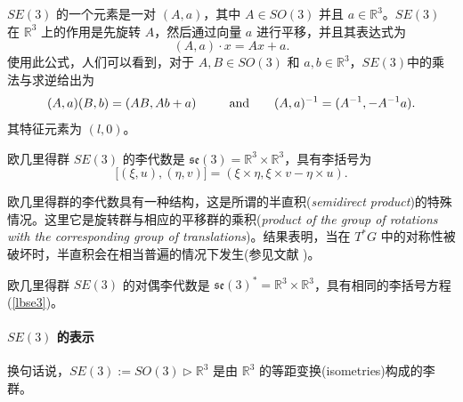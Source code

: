 \documentclass[11pt,fontset=founder]{ctexart}
\begin{document}
$SE(3)$ 的一个元素是一对 $(A,a)$，其中 $A\in SO(3)$ 并且 $a\in \mathbb{R}^{3}$。$SE(3)$ 在 $\mathbb{R}^{3}$ 上的作用是先旋转 $A$，然后通过向量 $a$ 进行平移，并且其表达式为
\begin{equation*}
(A,a)\cdot x=Ax+a.
\end{equation*}
使用此公式，人们可以看到，对于 $A,B\in SO(3)$ 和 $a,b\in \mathbb{R}^{3}$，$SE(3)$中的乘法与求逆给出为
\begin{equation*}
(A,a)(B,b)=(AB,Ab+a)\qquad \text{and\qquad }(A,a)^{-1}=(A^{-1},-A^{-1}a).
\end{equation*}
其特征元素为 $(l,0)$。

欧几里得群 $SE(3)$ 的李代数是 $\mathfrak{se}(3)=\mathbb{R}^{3}\times \mathbb{R}^{3}$，具有李括号为
\begin{equation}
\lbrack (\xi ,u),(\eta ,v)]=(\xi \times \eta ,\xi \times v-\eta \times u).
\label{lbse3}
\end{equation}

欧几里得群的李代数具有一种结构，这是所谓的半直积(\emph{semidirect product})的特殊情况。这里它是旋转群与相应的平移群的乘积(\emph{product of the group of rotations with the corresponding group of translations})。结果表明，当在 $T^{\ast }G$ 中的对称性被破坏时，半直积会在相当普遍的情况下发生(参见文献 \cite{Marsden,GaneshSprBig,GaneshADG})。

欧几里得群 $SE(3)$ 的对偶李代数是 $\mathfrak{se}(3)^{\ast }=\mathbb{R}^{3}\times \mathbb{R}^{3}$，具有相同的李括号方程(\ref{lbse3})。

\paragraph{$SE(3)$ 的表示}

换句话说，$SE(3):=SO(3)\rhd \mathbb{R}^{3}$ 是由 $\mathbb{R}^{3}$ 的等距变换(isometries)构成的李群。
\end{document}
